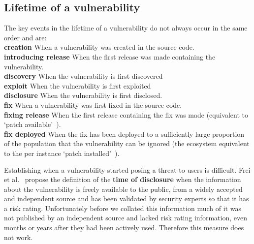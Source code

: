\documentclass[conference,a4paper,twoside]{IEEEtran}
\let\OldTodo\todo
\renewcommand{\todo}{\OldTodo[inline]}
\newcommand{\todolater}[1]{}%
\begin{document}
\subsection{Lifetime of a vulnerability}

The key events in the lifetime of a vulnerability do not always occur in the same order and are:\\
\textbf{creation} When a vulnerability was created in the source code.\\
\textbf{introducing release} When the first release was made containing the vulnerability.\\
\textbf{discovery} When the vulnerability is first discovered\\
\textbf{exploit} When the vulnerability is first exploited\\
\textbf{disclosure} When the vulnerability is first disclosed.\\ %
\textbf{fix} When a vulnerability was first fixed in the source code.\\
\textbf{fixing release} When the first release containing the fix was made (equivalent to `patch available'~\cite{Frei2010}).\\
\textbf{fix deployed} When the fix has been deployed to a sufficiently large proportion of the population that the vulnerability can be ignored (the ecosystem equivalent to the per instance `patch installed'~\cite{Frei2010}).
\todolater{Does this look nice?}


Establishing when a vulnerability started posing a threat to users is difficult.
Frei et al.~\cite{Frei2010} propose the definition of the {\bf time of disclosure} when the information about the vulnerability is freely available to the public, from a widely accepted and independent source and has been validated by security experts so that it has a risk rating.
Unfortunately before we collated this information much of it was not published by an independent source and lacked risk rating information, even months or years after they had been actively used.
Therefore this measure does not work.
\end{document}
